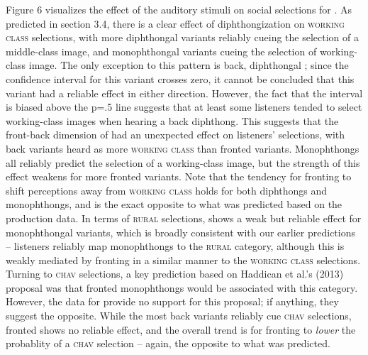 \documentclass[PWPL]{article}
\begin{document}
Figure 6 visualizes the effect of the auditory stimuli on social selections for . As predicted in section 3.4, there is a clear effect of diphthongization on \textsc{working class} selections, with more diphthongal variants reliably cueing the selection of a middle-class image, and monophthongal variants cueing the selection of working-class image. The only exception to this pattern is back, diphthongal ; since the confidence interval for this variant crosses zero, it cannot be concluded that this variant had a reliable effect in either direction. However, the fact that the interval is biased above the p=.5 line suggests that at least some listeners tended to select working-class images when hearing a back diphthong. This suggests that the front-back dimension of  had an unexpected effect on listeners' selections, with back variants heard as more \textsc{working class} than fronted variants. Monophthongs all reliably predict the selection of a working-class image, but the strength of this effect weakens for more fronted variants. Note that the tendency for fronting to shift perceptions away from \textsc{working class} holds for both diphthongs and monophthongs, and is the exact opposite to what was predicted based on the production data. In terms of \textsc{rural} selections,  shows a weak but reliable effect for monophthongal variants, which is broadly consistent with our earlier predictions -- listeners reliably map  monophthongs to the \textsc{rural} category, although this is weakly mediated by fronting in a similar manner to the \textsc{working class} selections. Turning to \textsc{chav} selections, a key prediction based on Haddican et al.'s (2013) proposal was that fronted  monophthongs would be associated with this category. However, the data for  provide no support for this proposal; if anything, they suggest the opposite. While the most back  variants reliably cue \textsc{chav} selections, fronted  shows no reliable effect, and the overall trend is for fronting to \textit{lower} the probablity of a \textsc{chav} selection -- again, the opposite to what was predicted.
\end{document}
